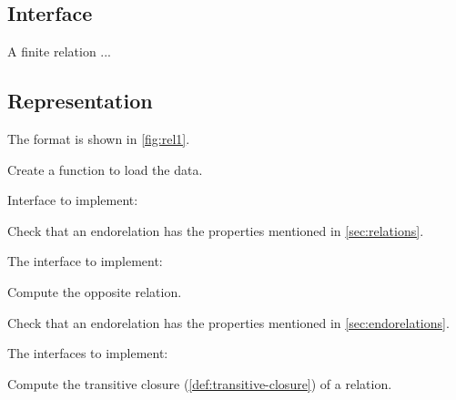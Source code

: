 \subsection{Interface}

A finite relation  ...


\subsection{Representation}

The format is shown in \cref{fig:rel1}.


\begin{exercise}
  Create a function to load the data.

  Interface to implement:
%

\end{exercise}


%  

\begin{exercise}

  Check that an endorelation has the properties mentioned in \cref{sec:relations}.

  The interface to implement:

\end{exercise}




\begin{exercise}[Opposite]
  Compute the opposite relation.


\end{exercise}

\begin{exercise}

  Check that an endorelation has the properties mentioned in \cref{sec:endorelations}.

  The interfaces to implement:

\end{exercise}

\begin{exercise}
  Compute the transitive closure (\cref{def:transitive-closure}) of a relation.


\end{exercise}

